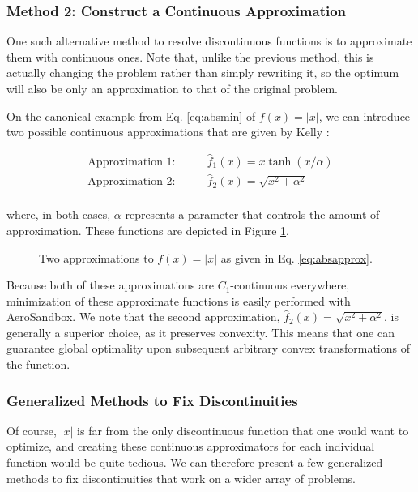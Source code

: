 \subsubsection{Method 2: Construct a Continuous Approximation}

One such alternative method to resolve discontinuous functions is to approximate them with continuous ones. Note that, unlike the previous method, this is actually changing the problem rather than simply rewriting it, so the optimum will also be only an approximation to that of the original problem.

On the canonical example from Eq. \ref{eq:absmin} of $f(x) = |x|$, we can introduce two possible continuous approximations that are given by Kelly \cite{mpk2017}:

\begin{equation}
    \begin{aligned}
        \text{Approximation 1:}& \qquad \hat{f}_1(x) = x \tanh(x / \alpha) \\
        \text{Approximation 2:}& \qquad \hat{f}_2(x) = \sqrt{x^2 + \alpha^2} \\
    \end{aligned}
    \label{eq:absapprox}
\end{equation}

\noindent
where, in both cases, $\alpha$ represents a parameter that controls the amount of approximation. These functions are depicted in Figure \ref{fig:absapprox}.

\begin{figure}[H]
    \centering
    \ifdraft{}{}
    \caption{Two approximations to $f(x) = |x|$ as given in Eq. \ref{eq:absapprox}.}
    \label{fig:absapprox}
\end{figure}

Because both of these approximations are $C_1$-continuous everywhere, minimization of these approximate functions is easily performed with AeroSandbox. We note that the second approximation, $\hat{f}_2(x) = \sqrt{x^2 + \alpha^2}$, is generally a superior choice, as it preserves convexity. This means that one can guarantee global optimality upon subsequent arbitrary convex transformations of the function.

\subsubsection{Generalized Methods to Fix Discontinuities}

Of course, $|x|$ is far from the only discontinuous function that one would want to optimize, and creating these continuous approximators for each individual function would be quite tedious. We can therefore present a few generalized methods to fix discontinuities that work on a wider array of problems.

